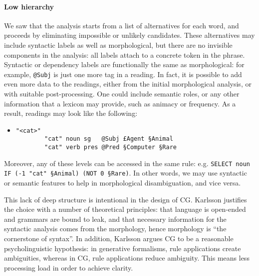 \paragraph{Low hierarchy}


We saw that the analysis starts from a list of alternatives for each word, and proceeds by eliminating impossible or unlikely candidates.
These alternatives may include syntactic labels as well as morphological, but there are no invisible components in the analysis: all labels attach to a concrete token in the phrase.
Syntactic or dependency labels are functionally the same as morphological: for example, \texttt{@Subj} is just one more tag in a reading.
In fact, it is possible to add even more data to the readings, either from the initial morphological analysis, or with suitable post-processing. One could include semantic roles, or any other information that a lexicon may provide, such as animacy or frequency.
As a result, readings may look like the following:

\begin{itemize}
\item[] 
\begin{verbatim}
"<cat>"
        "cat" noun sg   @Subj £Agent §Animal
        "cat" verb pres @Pred §Computer §Rare
\end{verbatim}
\end{itemize}

\noindent Moreover, any of these levels can be accessed in the same rule: e.g. \texttt{SELECT noun IF (-1 "cat" §Animal) (NOT 0 §Rare)}. 
In other words, we may use syntactic or semantic features to help in morphological disambiguation, and vice versa.

This lack of deep structure is intentional in the design of CG.
Karlsson \cite{karlsson1995constraint} justifies the choice with a number of
theoretical principles: that language is open-ended and grammars are
bound to leak, and that necessary information for the syntactic analysis
comes from the morphology, hence morphology is ``the cornerstone of
syntax''. 
In addition, Karlsson \cite{karlsson1995constraint} argues CG to be a reasonable 
psycholinguistic hypothesis: 
in generative formalisms, rule applications create ambiguities,
whereas in CG, rule applications reduce ambiguity. This means less processing load 
in order to achieve clarity. 


